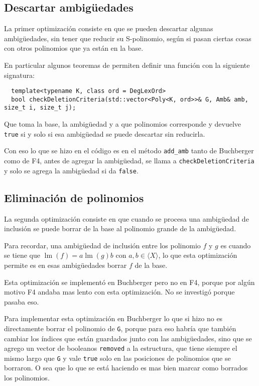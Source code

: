 \documentclass{report}
\theoremstyle{customstyle}
\theoremstyle{factstyle}
\DeclareMathOperator{\lm}{lm}
\begin{document}
\subsection{Descartar ambigüedades}

La primer optimización consiste en que se pueden descartar algunas ambigüedades, sin tener que reducir su S-polinomio, según si pasan ciertas cosas con otros polinomios que ya están en la base.

En particular algunos teoremas de \cite{thesis:Hof20} permiten definir una función con la siguiente signatura:

\begin{verbatim}
  template<typename K, class ord = DegLexOrd>
  bool checkDeletionCriteria(std::vector<Poly<K, ord>>& G, Amb& amb, size_t i, size_t j);
\end{verbatim}

Que toma la base, la ambigüedad y a que polinomios corresponde y devuelve \texttt{true} si y solo si esa ambigüedad se puede descartar sin reducirla.

Con eso lo que se hizo en el código es en el método \texttt{add\_amb} tanto de Buchberger como de F4, antes de agregar la ambigüedad, se llama a \texttt{checkDeletionCriteria} y solo se agrega la ambigüedad si da \texttt{false}.

\subsection{Eliminación de polinomios}

La segunda optimización consiste en que cuando se procesa una ambigüedad de inclusión se puede borrar de la base al polinomio grande de la ambigüedad.

Para recordar, una ambigüedad de inclusión entre los polinomio $f$ y $g$ es cuando se tiene que $\lm(f) = a \lm(g) b$ con $a, b ∈ ⟨X⟩$, lo que esta optimización permite es en esas ambigüedades borrar $f$ de la base.

Esta optimización se implementó en Buchberger pero no en F4, porque por algún motivo F4 andaba mas lento con esta optimización. No se investigó porque pasaba eso.

Para implementar esta optimización en Buchberger lo que si hizo no es directamente borrar el polinomio de \texttt{G}, porque para eso habría que también cambiar los índices que están guardados junto con las ambigüedades, sino que se agrego un vector de booleanos \texttt{removed} a la estructura, que tiene siempre el mismo largo que \texttt{G} y vale \texttt{true} solo en las posiciones de polinomios que se borraron. O sea que lo que se está haciendo es mas bien marcar como borrados los polinomios.
\end{document}
